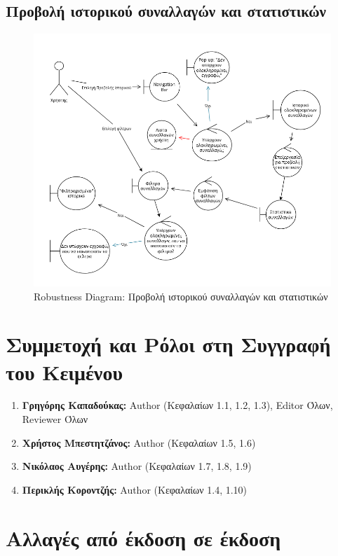 \documentclass[12pt,a4paper]{article}
\begin{document}
\subsection{Προβολή ιστορικού συναλλαγών και στατιστικών}
\begin{figure}[H]
	\includegraphics[width=\textwidth]{History and Statistics Robustness.png}
	\caption{Robustness Diagram: Προβολή ιστορικού συναλλαγών και στατιστικών}
	\label{Robustness Diagram: Προβολή ιστορικού συναλλαγών και στατιστικών}
\end{figure}

\section{Συμμετοχή και Ρόλοι στη Συγγραφή του Κειμένου}
\begin{enumerate}
	\item \textbf{Γρηγόρης Καπαδούκας:} Author (Κεφαλαίων 1.1, 1.2, 1.3), Editor Όλων, Reviewer Όλων
	\item \textbf{Χρήστος Μπεστητζάνος:} Author (Κεφαλαίων 1.5, 1.6)
   	\item \textbf{Νικόλαος Αυγέρης:} Author (Κεφαλαίων 1.7, 1.8, 1.9)
	\item \textbf{Περικλής Κοροντζής:} Author (Κεφαλαίων 1.4, 1.10)
\end{enumerate}

\section{Αλλαγές από έκδοση σε έκδοση}
\end{document}
